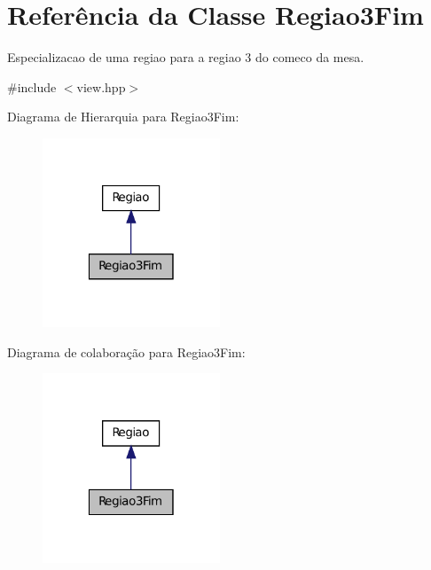 \hypertarget{classRegiao3Fim}{
\section{Referência da Classe Regiao3Fim}
\label{classRegiao3Fim}
}


Especializacao de uma regiao para a regiao 3 do comeco da mesa.  




{\ttfamily \#include $<$view.hpp$>$}



Diagrama de Hierarquia para Regiao3Fim:\nopagebreak
\begin{figure}[H]
\begin{center}
\leavevmode
\includegraphics[width=150pt]{classRegiao3Fim__inherit__graph}
\end{center}
\end{figure}


Diagrama de colaboração para Regiao3Fim:\nopagebreak
\begin{figure}[H]
\begin{center}
\leavevmode
\includegraphics[width=150pt]{classRegiao3Fim__coll__graph}
\end{center}
\end{figure}
